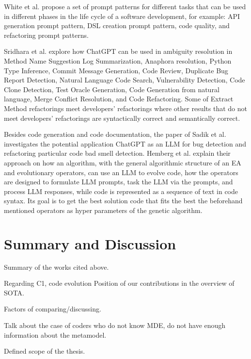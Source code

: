  White et al. \cite{White2024} propose a set of prompt patterns for different tasks that can be used in different phases in the life cycle of a software development, for example: API generation prompt pattern, DSL creation prompt pattern, code quality, and refactoring prompt patterns.
  
Sridhara et al. \cite{sridhara2023chatgpt} explore how ChatGPT can be used in ambiguity resolution in Method Name Suggestion
   Log Summarization, Anaphora resolution, Python Type Inference,  Commit Message Generation, Code Review, Duplicate Bug Report Detection, Natural Language Code Search, Vulnerability Detection, Code Clone Detection, Test Oracle Generation, Code Generation from natural language, Merge Conflict Resolution, and Code Refactoring. Some of Extract Method refactorings meet developers' refactorings where other  results that do not meet developers' refactorings  are syntactically correct and semantically correct.

  Besides code generation and code documentation, the paper of Sadik et al. \cite{sadik2023analysis} investigates the potential application ChatGPT as an LLM for bug detection and refactoring particular code bad smell detection.
  Hemberg et al. \cite{hemberg2024evolving} explain their approach on how an algorithm, with the general algorithmic structure of an EA and evolutionary operators, can use an LLM to evolve code, how the operators are designed to formulate LLM prompts, task the LLM via the prompts, and process LLM responses, while code is represented as a sequence of text in code syntax. Its goal is to get the best solution code that fits the best the beforehand mentioned operators as hyper parameters of the genetic algorithm.
  
  \section{Summary and Discussion}
  Summary of the works cited above.
  
  Regarding C1, code evolution 
  Position of our contributions in the overview of SOTA. 
  
  Factors of comparing/discussing.
  
  Talk about the case of coders who do not know MDE, do not have enough information about the metamodel.
  
  Defined scope of the thesis.
  



